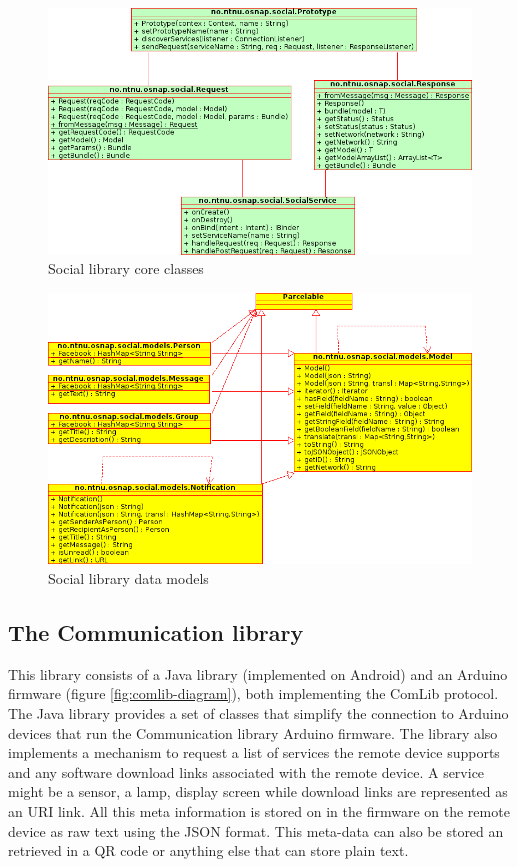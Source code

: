 \begin{figure}[h!]
	\centering \includegraphics[scale=0.8]{img/architecture-socialclasses.png}
	\caption{Social library core classes}
	\label{fig:social-classes}
\end{figure}

\begin{figure}[h!]
	\centering \includegraphics[scale=0.7]{img/architecture-modelclasses.png}
	\caption{Social library data models}
	\label{fig:model-classes}
\end{figure}


\subsection{The Communication library}
This library consists of a Java library (implemented on Android) and an Arduino firmware (figure \ref{fig:comlib-diagram}),
both implementing the ComLib protocol. The Java library provides a set of classes that simplify the connection to Arduino
devices that run the Communication library Arduino firmware. The library also implements a mechanism to request a list of 
services the remote device supports and any software download links associated with the remote device. A service might
be a sensor, a lamp, display screen while download links are represented as an URI link. All this meta information is stored
on in the firmware on the remote device as raw text using the JSON format. This meta-data can also be stored an retrieved
in a QR code or anything else that can store plain text.

